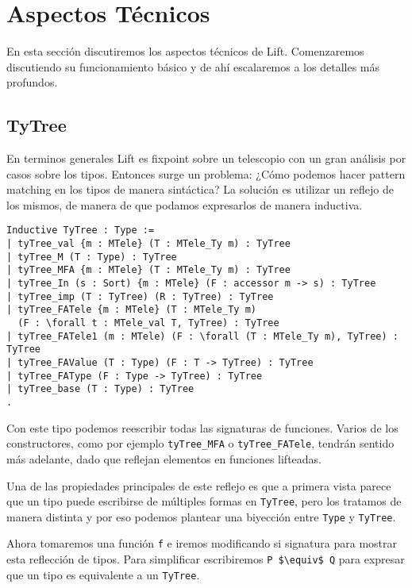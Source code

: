 \section{Aspectos Técnicos}

En esta sección discutiremos los aspectos técnicos de Lift. Comenzaremos discutiendo su funcionamiento básico y de ahí
escalaremos a los detalles más profundos. 

\subsection{TyTree}

En terminos generales Lift es fixpoint sobre un telescopio con un gran análisis por casos sobre los tipos.
Entonces surge un problema: ¿Cómo podemos hacer pattern matching en los tipos de manera sintáctica?
La solución es utilizar un reflejo de los mismos, de manera de que podamos expresarlos de manera inductiva.

\begin{lstlisting}
Inductive TyTree : Type :=
| tyTree_val {m : MTele} (T : MTele_Ty m) : TyTree
| tyTree_M (T : Type) : TyTree
| tyTree_MFA {m : MTele} (T : MTele_Ty m) : TyTree
| tyTree_In (s : Sort) {m : MTele} (F : accessor m -> s) : TyTree
| tyTree_imp (T : TyTree) (R : TyTree) : TyTree
| tyTree_FATele {m : MTele} (T : MTele_Ty m)
  (F : \forall t : MTele_val T, TyTree) : TyTree
| tyTree_FATele1 (m : MTele) (F : \forall (T : MTele_Ty m), TyTree) : TyTree
| tyTree_FAValue (T : Type) (F : T -> TyTree) : TyTree
| tyTree_FAType (F : Type -> TyTree) : TyTree
| tyTree_base (T : Type) : TyTree
.
\end{lstlisting}

Con este tipo podemos reescribir todas las signaturas de funciones. Varios de los constructores, como por ejemplo
\lstinline{tyTree_MFA} o \lstinline{tyTree_FATele}, tendrán sentido más adelante, dado que reflejan elementos en
funciones lifteadas.

Una de las propiedades principales de este reflejo es que a primera vista parece que un tipo puede escribirse de
múltiples formas en \lstinline{TyTree}, pero los tratamos de manera distinta y por eso podemos plantear una biyección
entre \lstinline{Type} y \lstinline{TyTree}.

Ahora tomaremos una función \lstinline{f} e iremos modificando si signatura para mostrar esta reflección de tipos.
Para simplificar escribiremos \lstinline{P $\equiv$ Q} para expresar que un tipo es equivalente a un \lstinline{TyTree}.

